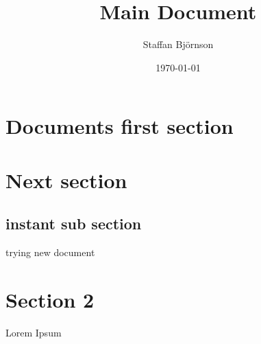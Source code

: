 \documentclass[11pt]{article}
\title{Main Document}
\author{ Staffan Björnson }
\date{\today}
\begin{document}
\maketitle	
\pagebreak

\tableofcontents
\pagebreak


\section{Documents first section}

\section{ Next section }

\subsection{ instant sub section }

trying new document 

\pagebreak
\section{Section 2}
Lorem Ipsum \\

\end{document}

